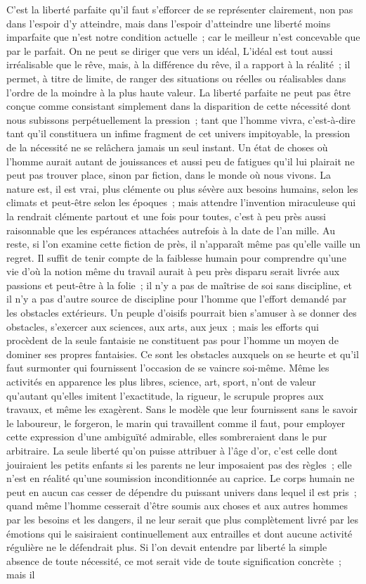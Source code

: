 \documentclass[french,twoside]{book} %
\begin{document}
C'est la liberté parfaite qu'il faut s'efforcer de se représenter clairement, non pas dans l'espoir d'y atteindre, mais dans l'espoir d'atteindre une liberté moins imparfaite que n'est notre condition actuelle ; car le meilleur n'est concevable que par le parfait. On ne peut se diriger que vers un idéal, L'idéal est tout aussi irréalisable que le rêve, mais, à la différence du rêve, il a rapport à la réalité ; il permet, à titre de limite, de ranger des situations ou réelles ou réalisables dans l'ordre de la moindre à la plus haute valeur. La liberté parfaite ne peut pas être conçue comme consistant simplement dans la disparition de cette nécessité dont nous subissons perpétuellement la pression ; tant que l'homme vivra, c'est-à-dire tant qu'il constituera un infime fragment de cet univers impitoyable, la pression de la nécessité ne se relâchera jamais un seul instant. Un état de choses où l'homme aurait autant de jouissances et aussi peu de fatigues qu'il lui plairait ne peut pas trouver place, sinon par fiction, dans le monde où nous vivons. La nature est, il est vrai, plus clémente ou plus sévère aux besoins humains, selon les climats et peut-être selon les époques ; mais attendre l'invention miraculeuse qui la rendrait clémente partout et une fois pour toutes, c'est à peu près aussi raisonnable que les espérances attachées autrefois à la date de l'an mille. Au reste, si l'on examine cette fiction de près, il n'apparaît même pas qu'elle vaille un regret. Il suffit de tenir compte de la faiblesse humain pour comprendre qu'une vie d'où la notion même du travail aurait à peu près disparu serait livrée aux passions et peut-être à la folie ; il n'y a pas de maîtrise de soi sans discipline, et il n'y a pas d'autre source de discipline pour l'homme que l'effort demandé par les obstacles extérieurs. Un peuple d'oisifs pourrait bien s'amuser à se donner des obstacles, s'exercer aux sciences, aux arts, aux jeux ; mais les efforts qui procèdent de la seule fantaisie ne constituent pas pour l'homme un moyen de dominer ses propres fantaisies. Ce sont les obstacles auxquels on se heurte et qu'il faut surmonter qui fournissent l'occasion de se vaincre soi-même. Même les activités en apparence les plus libres, science, art, sport, n'ont de valeur qu'autant qu'elles imitent l'exactitude, la rigueur, le scrupule propres aux travaux, et même les exagèrent. Sans le modèle que leur fournissent sans le savoir le laboureur, le forgeron, le marin qui travaillent comme il faut, pour employer cette expression d'une ambiguïté admirable, elles sombreraient dans le pur arbitraire. La seule liberté qu'on puisse attribuer à l'âge d'or, c'est celle dont jouiraient les petits enfants si les parents ne leur imposaient pas des règles ; elle n'est en réalité qu'une soumission inconditionnée au caprice. Le corps humain ne peut en aucun cas cesser de dépendre du puissant univers dans lequel il est pris ; quand même l'homme cesserait d'être soumis aux choses et aux autres hommes par les besoins et les dangers, il ne leur serait que plus complètement livré par les émotions qui le saisiraient continuellement aux entrailles et dont aucune activité régulière ne le défendrait plus. Si l'on devait entendre par liberté la simple absence de toute nécessité, ce mot serait vide de toute signification concrète ; mais il 
\end{document}
